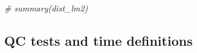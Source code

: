 \documentclass[]{article}
\newenvironment{Shaded}{\begin{snugshade}}{\end{snugshade}}
\newcommand{\StringTok}[1]{\textcolor[rgb]{0.31,0.60,0.02}{#1}}
\newcommand{\CommentTok}[1]{\textcolor[rgb]{0.56,0.35,0.01}{\textit{#1}}}
\newcommand{\OperatorTok}[1]{\textcolor[rgb]{0.81,0.36,0.00}{\textbf{#1}}}
\newcommand{\NormalTok}[1]{#1}
\begin{document}
\begin{Shaded}
\begin{Highlighting}[]
\CommentTok{# summary(dist_lm2)}
\end{Highlighting}
\end{Shaded}

\subsection{QC tests and time
definitions}\label{qc-tests-and-time-definitions}

\begin{Shaded}
\end{Shaded}
\end{document}
